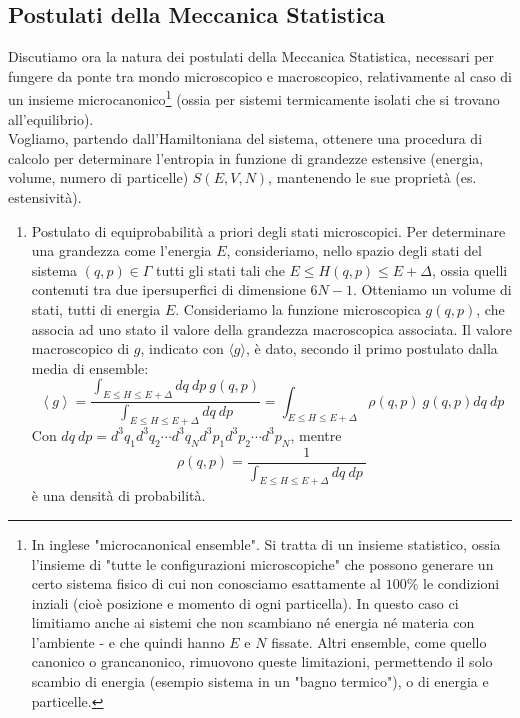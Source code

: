 \documentclass[12pt]{article}
\begin{document}
\subsection{Postulati della Meccanica Statistica}
Discutiamo ora la natura dei postulati della Meccanica Statistica, necessari per fungere da ponte tra mondo microscopico e macroscopico, relativamente al caso di un insieme microcanonico\footnote{In inglese "microcanonical ensemble". Si tratta di un insieme statistico, ossia l'insieme di "tutte le configurazioni microscopiche" che possono generare un certo sistema fisico di cui non conosciamo esattamente al $100\%$ le condizioni inziali (cioè posizione e momento di ogni particella). In questo caso ci limitiamo anche ai sistemi che non scambiano né energia né materia con l'ambiente - e che quindi hanno $E$ e $N$ fissate. Altri ensemble, come quello canonico o grancanonico, rimuovono queste limitazioni, permettendo il solo scambio di energia (esempio sistema in un "bagno termico"), o di energia e particelle.} (ossia per sistemi termicamente isolati che si trovano all'equilibrio).\\
Vogliamo, partendo dall'Hamiltoniana del sistema, ottenere una procedura di calcolo per determinare l'entropia in funzione di grandezze estensive (energia, volume, numero di particelle) $S(E,V,N)$, mantenendo le sue proprietà (es. estensività).
\begin{enumerate}
    \item Postulato di equiprobabilità a priori degli stati
    microscopici. Per determinare una grandezza come l'energia $E$, consideriamo, nello spazio degli stati del sistema $\left(q,p\right)\in \Gamma$ tutti gli stati tali che $E\leq H\left(q,p\right)\leq E+\Delta$, ossia quelli contenuti tra due ipersuperfici di dimensione $6N-1$. Otteniamo un volume di stati, tutti di energia $E$. Consideriamo la funzione microscopica $g\left(q,p\right)$, che associa ad uno stato il valore della grandezza macroscopica associata. Il valore macroscopico di $g$, indicato con $\langle g\rangle$, è dato, secondo il primo postulato dalla media di ensemble:
	\[ \left\langle g\right\rangle=\frac{\int_{E\le H\le E+\Delta}{dq\ dp\ g\left(q,p\right)}}{\int_{E\le H\le E+\Delta}{dq\ dp}}=\int_{E\le H\le E+\Delta}{\rho\left(q,p\right)\ g\left(q,p\right)dq\ dp}
	\]
    Con $dq\ dp=d^3q_1d^3q_2\cdots d^3q_Nd^3p_1d^3p_2\cdots d^3p_N$, mentre \[ \rho\left(q,p\right)=\frac{1}{\int_{E\le H\le E+\Delta}{dq\ dp\ }} \] è una densità di probabilità.
\end{enumerate}
\end{document}
